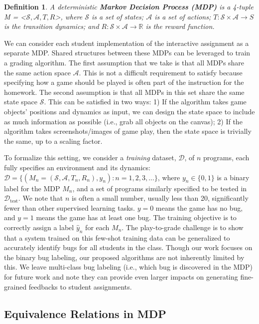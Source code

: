 \documentclass{article}
\newcommand{\train}{\mathcal{D}}
\newcommand{\test}{\mathcal{D_{\mathrm{test}}}}
\def\gA{{\mathcal{A}}}
\def\gS{{\mathcal{S}}}
\newcommand{\R}{\mathbb{R}}
\newtheorem{definition}{Definition}[section]
\newcommand{\EDIT}[1]{#1}%
\newcommand{\PIECH}[1]{#1}%
\begin{document}
\begin{definition}
A deterministic \textbf{Markov Decision Process (MDP)} is a 4-tuple M = <$\gS, \gA, T, R$>, where $\gS$ is a set of states; $\gA$ is a set of actions; $T: \gS \times \gA \rightarrow S$ is the transition dynamics; and $R: \gS \times \gA \rightarrow \R$ is the reward function.
\end{definition}
We can consider each student implementation of the interactive assignment as a separate MDP. Shared structures between these MDPs can be leveraged to train a grading algorithm. The first assumption that we take is that all MDPs share the same action space $\gA$. This is not a difficult requirement to satisfy because specifying how a game should be played is often part of the instruction for the homework. The second assumption is that all MDPs in this set share the same state space $\gS$. This can be satisfied in two ways: 1) If the algorithm takes game objects' positions and dynamics as input, we can design the state space to include as much information as possible (i.e., grab all objects on the canvas); 2) If the algorithm takes screenshots/images of game play, then the state space is trivially the same, up to a scaling factor. 

To formalize this setting, we consider a \emph{training} dataset, $\train$, of \EDIT{$n$} programs, each fully specifies an environment and its dynamics: $\train = \{(M_n=(\gS, \gA, T_n, R_n), y_n): n=1,2,3,...\}$, where $y_n \in \{0, 1\}$ is a binary label for the MDP $M_n$, and a set of programs similarly specified to be tested in $\test$. We note that $n$ is often a small number, usually less than 20, significantly fewer than other supervised learning tasks. $y=0$ means the game has no bug, and $y=1$ means the game has at least one bug.
The training objective is to correctly assign a label $\hat y_n$ for each $M_n$. \PIECH{The play-to-grade challenge is to show that a system trained on this few-shot training data can be generalized to accurately identify bugs for all students in the class.}
Though our work focuses on the binary \EDIT{bug} labeling, our proposed algorithms are not inherently limited by this. We leave multi-class \EDIT{bug} labeling \EDIT{(i.e., which bug is discovered in the MDP)} for future work and note they can provide even larger impacts on generating fine-grained feedbacks to student assignments. 

 



\subsection{Equivalence Relations in MDP}
\vspace{-2mm} 
\end{document}
